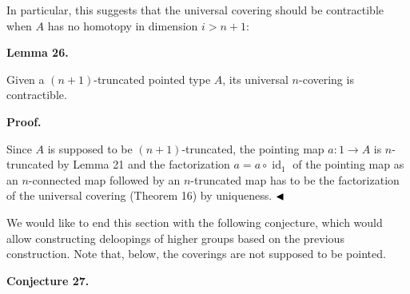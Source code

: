  
 
 
In particular, this suggests that the universal covering should be contractible when $A$ has no homotopy in dimension $i>n+1$:\par
 
 
 
\par\medskip\noindent\textbf{Lemma 26.}\par
 
 
Given a $(n{+}1)$-truncated pointed type $A$, its universal $n$-covering is contractible.\par
 
 
 
 
 
\par\medskip\noindent\textbf{Proof.}\par
 
 
Since $A$ is supposed to be $(n{+}1)$-truncated, the pointing map $a:1\to A$ is $n$-truncated by Lemma 21 and the factorization $a=a\circ\operatorname{id}_{1}$ of the pointing map as an $n$-connected map followed by an $n$-truncated map has to be the factorization of the universal covering (Theorem 16) by uniqueness. $\hfill\blacktriangleleft$\par
 
 
 
We would like to end this section with the following conjecture, which would allow constructing deloopings of higher groups based on the previous construction. Note that, below, the coverings are not supposed to be pointed.\par
 
 
 
\par\medskip\noindent\textbf{Conjecture 27.}\par
 
